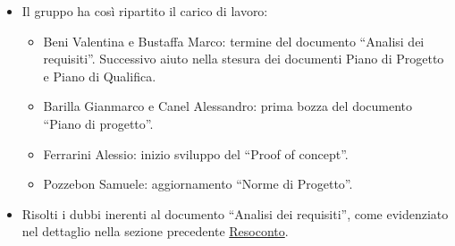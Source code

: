 \begin{itemize}
	\item Il gruppo ha così ripartito il carico di lavoro:
	\begin{itemize}
		\item Beni Valentina e Bustaffa Marco: termine del documento ``Analisi dei requisiti''. Successivo aiuto nella stesura dei documenti Piano di Progetto e Piano di Qualifica. 
		\item Barilla Gianmarco e Canel Alessandro: prima bozza del documento ``Piano di progetto''.
		\item Ferrarini Alessio: inizio sviluppo del ``Proof of concept''.
		\item Pozzebon Samuele: aggiornamento ``Norme di Progetto''.
	\end{itemize}
	\item Risolti i dubbi inerenti al documento ``Analisi dei requisiti'', come evidenziato nel dettaglio nella sezione precedente \hyperref[sec:Resoconto]{Resoconto}.
\end{itemize}
